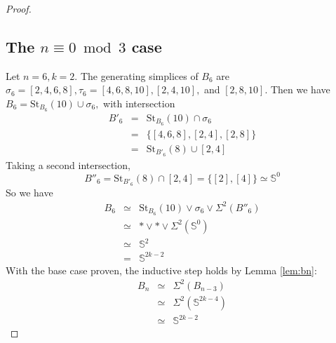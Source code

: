 \documentclass{amsart}
\theoremstyle{definition}
\newcommand{\zs}{{\mathbb S}}
\newcommand{\smpure}{{\mathcal{SM}}_{\textrm{pure}}}
\begin{document}
\begin{proof}
\subsection*{The $n\equiv 0\bmod 3$ case} Let $n=6,k=2$. The generating simplices of $B_6$ are $\sigma_6=[2,4,6,8],\tau_6=[4,6,8,10],[2,4,10],$ and $[2,8,10]$. Then we have $B_6= \text{St}_{B_6}(10)\cup\sigma_6,$  with intersection
    \begin{eqnarray*}
        B'_6 &= &\text{St}_{B_6}(10)\cap\sigma_6 \\
        &= & \{[4,6,8],[2,4],[2,8]\}\\
        &=  & \text{St}_{B'_6}(8)\cup [2,4]
    \end{eqnarray*}
Taking a second intersection, 
    $$B''_6=\text{St}_{B'_6}(8)\cap [2,4]=\{[2],[4]\}\simeq\zs^0$$
So we have
    \begin{eqnarray*}
    B_6 &\simeq & \text{St}_{B_6}(10)\vee\sigma_6\vee\Sigma^2(B''_6)\\
    & \simeq & \ast\vee\ast\vee\Sigma^2(\zs^0)\\
    & \simeq &\zs^2 \\
    & = &\zs^{2k-2}
    \end{eqnarray*}
With the base case proven, the inductive step holds by Lemma \ref{lem:bn}:
    \begin{eqnarray*}
        B_n &\simeq &\Sigma^2(B_{n-3})\\
        &\simeq &\Sigma^2(\zs^{2k-4})\\
        &\simeq &\zs^{2k-2}
    \end{eqnarray*}
    

\end{proof}
\end{document}

